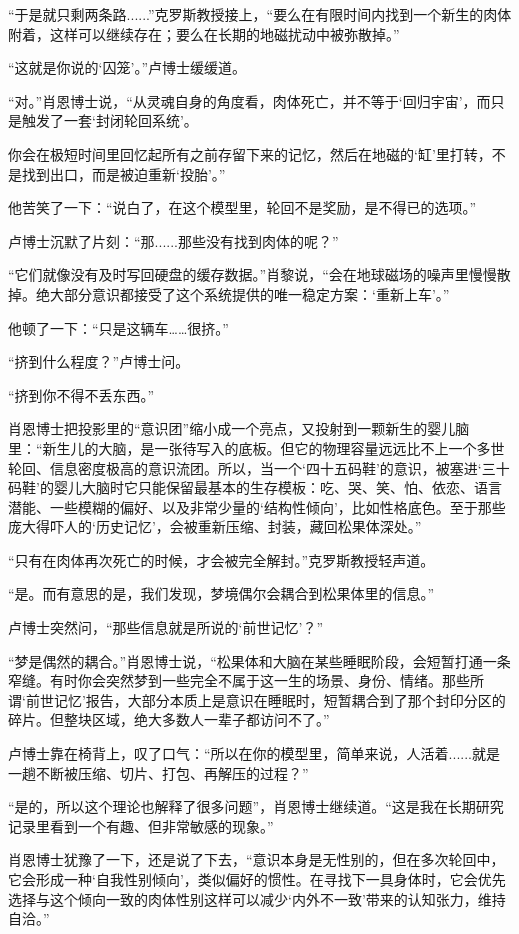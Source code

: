 “于是就只剩两条路......”克罗斯教授接上，“要么在有限时间内找到一个新生的肉体附着，这样可以继续存在；要么在长期的地磁扰动中被弥散掉。”

“这就是你说的‘囚笼’。”卢博士缓缓道。

“对。”肖恩博士说，“从灵魂自身的角度看，肉体死亡，并不等于‘回归宇宙’，而只是触发了一套‘封闭轮回系统’。

你会在极短时间里回忆起所有之前存留下来的记忆，然后在地磁的‘缸’里打转，不是找到出口，而是被迫重新‘投胎’。”

他苦笑了一下：“说白了，在这个模型里，轮回不是奖励，是不得已的选项。”

卢博士沉默了片刻：“那......那些没有找到肉体的呢？”

“它们就像没有及时写回硬盘的缓存数据。”肖黎说，“会在地球磁场的噪声里慢慢散掉。绝大部分意识都接受了这个系统提供的唯一稳定方案：‘重新上车’。”

他顿了一下：“只是这辆车……很挤。”

“挤到什么程度？”卢博士问。

“挤到你不得不丢东西。”

肖恩博士把投影里的“意识团”缩小成一个亮点，又投射到一颗新生的婴儿脑里：“新生儿的大脑，是一张待写入的底板。但它的物理容量远远比不上一个多世轮回、信息密度极高的意识流团。所以，当一个‘四十五码鞋’的意识，被塞进‘三十码鞋’的婴儿大脑时它只能保留最基本的生存模板：吃、哭、笑、怕、依恋、语言潜能、一些模糊的偏好、以及非常少量的‘结构性倾向’，比如性格底色。至于那些庞大得吓人的‘历史记忆’，会被重新压缩、封装，藏回松果体深处。”

“只有在肉体再次死亡的时候，才会被完全解封。”克罗斯教授轻声道。

“是。而有意思的是，我们发现，梦境偶尔会耦合到松果体里的信息。”

卢博士突然问，“那些信息就是所说的‘前世记忆’？”

“梦是偶然的耦合。”肖恩博士说，“松果体和大脑在某些睡眠阶段，会短暂打通一条窄缝。有时你会突然梦到一些完全不属于这一生的场景、身份、情绪。那些所谓‘前世记忆’报告，大部分本质上是意识在睡眠时，短暂耦合到了那个封印分区的碎片。但整块区域，绝大多数人一辈子都访问不了。”

卢博士靠在椅背上，叹了口气：“所以在你的模型里，简单来说，人活着......就是一趟不断被压缩、切片、打包、再解压的过程？”

“是的，所以这个理论也解释了很多问题”，肖恩博士继续道。“这是我在长期研究记录里看到一个有趣、但非常敏感的现象。”

肖恩博士犹豫了一下，还是说了下去，“意识本身是无性别的，但在多次轮回中，它会形成一种‘自我性别倾向’，类似偏好的惯性。在寻找下一具身体时，它会优先选择与这个倾向一致的肉体性别这样可以减少‘内外不一致’带来的认知张力，维持自洽。”

